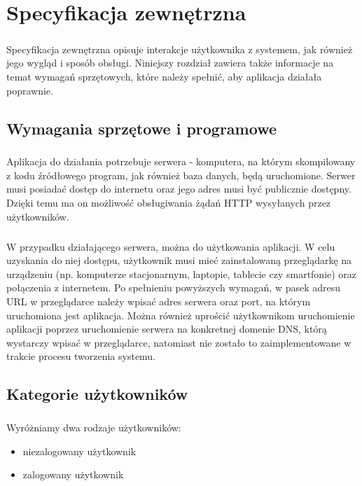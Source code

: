 \chapter{Specyfikacja zewnętrzna}
\label{ch:04}

\paragraph{}
Specyfikacja zewnętrzna opisuje interakcje użytkownika z systemem, jak również jego wygląd i sposób obsługi. Niniejszy rozdział zawiera także informacje na temat wymagań sprzętowych, które należy spełnić, aby aplikacja działała poprawnie.

\section{Wymagania sprzętowe i programowe}
\paragraph{}
Aplikacja do działania potrzebuje serwera - komputera, na którym skompilowany z kodu źródłowego program, jak również baza danych, będą uruchomione. Serwer musi posiadać dostęp do internetu oraz jego adres musi być publicznie dostępny. Dzięki temu ma on możliwość obsługiwania żądań HTTP wysyłanych przez użytkowników.

\paragraph{}
W przypadku działającego serwera, można do użytkowania aplikacji. W celu uzyskania do niej dostępu, użytkownik musi mieć zainstalowaną przeglądarkę na urządzeniu (np. komputerze stacjonarnym, laptopie, tablecie czy smartfonie) oraz połączenia z internetem. Po spełnieniu powyższych wymagań, w pasek adresu URL w przeglądarce należy wpisać adres serwera oraz port, na którym uruchomiona jest aplikacja. Można również uprościć użytkownikom uruchomienie aplikacji poprzez uruchomienie serwera na konkretnej domenie DNS, którą wystarczy wpisać w przeglądarce, natomiast nie zostało to zaimplementowane w trakcie procesu tworzenia systemu.

\section{Kategorie użytkowników}
\paragraph{}
Wyróżniamy dwa rodzaje użytkowników: 
\begin{itemize}
	\item niezalogowany użytkownik
	\item zalogowany użytkownik
\end{itemize}

